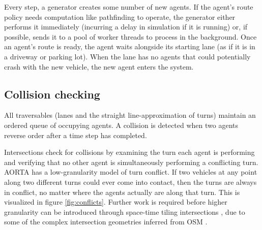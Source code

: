 \documentclass[letterpaper, 10 pt, conference]{ieeeconf}  %
\begin{document}
Every step, a generator creates some number of new agents. If the agent's route
policy needs computation like pathfinding to operate, the generator either
performs it immediately (incurring a delay in simulation if it is running) or,
if possible, sends it to a pool of worker threads to process in the background.
Once an agent's route is ready, the agent waits alongside its starting lane (as
if it is in a driveway or parking lot). When the lane has no agents that could
potentially crash with the new vehicle, the new agent enters the system. %

\subsection{Collision checking}

All traversables (lanes and the straight line-approximation of turns) maintain
an ordered queue of occupying agents. A collision is detected when two agents
reverse order after a time step has completed.

Intersections check for collisions by examining the turn each agent is
performing and verifying that no other agent is simultaneously performing a
conflicting turn. AORTA has a low-granularity model of turn conflict. If two
vehicles at any point along two different turns could ever come into contact,
then the turns are always in conflict, no matter where the agents actually are
along that turn. This is visualized in figure \ref{fig:conflicts}. Further work
is required before higher granularity can be introduced through space-time
tiling intersections \cite{JAIR08-dresner}, due to some of the complex
intersection geometries inferred from OSM .
\end{document}
